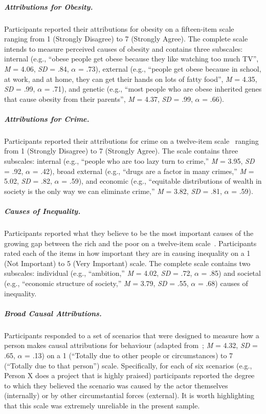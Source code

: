 \documentclass{sfuthesis}
\begin{document}
\subparagraph{Attributions for Obesity.} Participants reported their attributions for obesity on a fifteen-item scale~\cite{klaczynski04} ranging from 1 (Strongly Disagree) to 7 (Strongly Agree). The complete scale intends to measure perceived causes of obesity and contains three subscales: internal (e.g., “obese people get obese because they like watching too much TV”, \textit{M} = 4.06, \textit{SD} = .84, $\alpha$ = .73), external (e.g., “people get obese because in school, at work, and at home, they can get their hands on lots of fatty food”, \textit{M} = 4.35, \textit{SD} = .99, $\alpha$ = .71), and genetic (e.g., “most people who are obese inherited genes that cause obesity from their parents”, \textit{M} = 4.37, \textit{SD} = .99, $\alpha$ = .66).

\subparagraph{Attributions for Crime.} Participants reported their attributions for crime on a twelve-item scale~\cite{furnham83} ranging from 1 (Strongly Disagree) to 7 (Strongly Agree). The scale contains three subscales: internal (e.g., “people who are too lazy turn to crime,” \textit{M} = 3.95, \textit{SD} = .92, $\alpha$ = .42), broad external (e.g., “drugs are a factor in many crimes,”  \textit{M} = 5.02, \textit{SD} = .82, $\alpha$ = .59), and economic (e.g., “equitable distributions of wealth in society is the only way we can eliminate crime,” \textit{M} = 3.82, \textit{SD} = .81, $\alpha$ = .59).

\subparagraph{Causes of Inequality.} Participants reported what they believe to be the most important causes of the growing gap between the rich and the poor on a twelve-item scale~\cite{kraus09}. Participants rated each of the items in how important they are in causing inequality on a 1 (Not Important) to 5 (Very Important) scale. The complete scale contains two subscales: individual (e.g., “ambition,” \textit{M} = 4.02, \textit{SD} = .72, $\alpha$ = .85) and societal (e.g., “economic structure of society,” \textit{M} = 3.79, \textit{SD} = .55, $\alpha$ = .68) causes of inequality.

\subparagraph{Broad Causal Attributions.} Participants responded to a set of scenarios that were designed to measure how a person makes causal attributions for behaviour (adapted from~\cite{petersen82}; \textit{M} = 4.32, \textit{SD} = .65, $\alpha$ = .13) on a 1 (“Totally due to other people or circumstances) to 7 (“Totally due to that person”) scale. Specifically, for each of six scenarios (e.g., Person X does a project that is highly praised) participants reported the degree to which they believed the scenario was caused by the actor themselves (internally) or by other circumstantial forces (external). It is worth highlighting that this scale was extremely unreliable in the present sample. 
\end{document}
